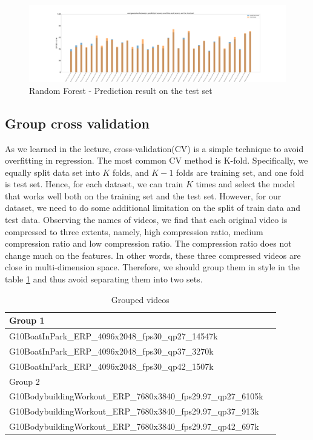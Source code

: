 \documentclass[10pt,conference,compsocconf]{IEEEtran}
\begin{document}
\begin{figure}[htbp]
\centering
\includegraphics[width = \linewidth]{comparasion_predit_real_rf.pdf}
\caption{Random Forest - Prediction result on the test set}
\label{result_rf}
\end{figure}

\subsection{Group cross validation}
As we learned in the lecture, cross-validation(CV) is a simple technique to avoid overfitting in regression. The most common CV method is K-fold. Specifically, we equally split data set into $K$ folds, and $K-1$ folds are training set, and one fold is test set. Hence, for each dataset, we can train $K$ times and select the model that works well both on the training set and the test set. However, for our dataset, we need to do some additional limitation on the split of train data and test data. Observing the names of videos, we find that each original video is compressed to three extents, namely, high compression ratio, medium compression ratio and low compression ratio. The compression ratio does not change much on the features. In other words, these three compressed videos are close in multi-dimension space. Therefore, we should group them in style in the table \ref{group_video} and thus avoid separating them into two sets. 
\begin{table}[h]
  \centering
  \begin{tabular}[c]{|l|l|}
    \hline
    Group 1 \\
    \hline
    G10BoatInPark\_ERP\_4096x2048\_fps30\_qp27\_14547k\\
    G10BoatInPark\_ERP\_4096x2048\_fps30\_qp37\_3270k\\
    G10BoatInPark\_ERP\_4096x2048\_fps30\_qp42\_1507k \\
    \hline
    Group 2  \\
    \hline
    G10BodybuildingWorkout\_ERP\_7680x3840\_fps29.97\_qp27\_6105k  \\
    G10BodybuildingWorkout\_ERP\_7680x3840\_fps29.97\_qp37\_913k  \\
    G10BodybuildingWorkout\_ERP\_7680x3840\_fps29.97\_qp42\_697k \\
    \hline
  \end{tabular}
  \caption{Grouped videos}
  \label{group_video}
\end{table}
\end{document}

